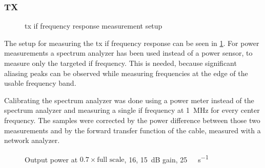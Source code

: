 \documentclass[12pt,a4paper,parskip=full,abstracton]{scrartcl}
\begin{document}
\subsubsection{TX}
\label{sec:iftx}
\begin{figure}[htb]
    \centering
    \caption{\gls{tx} \gls{if} frequency response measurement setup}
    \label{fig:txifsetup}
\end{figure}

The setup for measuring the \gls{tx} \gls{if} frequency response can be seen in
\cref{fig:txifsetup}. For power measurements a spectrum analyzer has been used
instead of a power sensor, to measure only the targeted \gls{if} frequency. This
is needed, because significant aliasing peaks can be observed while measuring
frequencies at the edge of the usable frequency band.

Calibrating the spectrum analyzer was done using a power meter instead of the
spectrum analyzer and measuring a single \gls{if} frequency at
\SI{1}{\mega\hertz} for every center frequency. The samples were corrected
by the power difference between those two measurements and by the forward
transfer function of the cable, measured with a network analyzer.

\begin{figure}[htb]
    \centering
{}
\caption{Output power at $0.7 \times \text{full scale}$, \SI{16}{\bit}, \SI{15}{\deci\bel} gain, \SI{25}{\mega\samples\per\second}}
    \label{fig:rfiftx16}
\end{figure}
\end{document}
